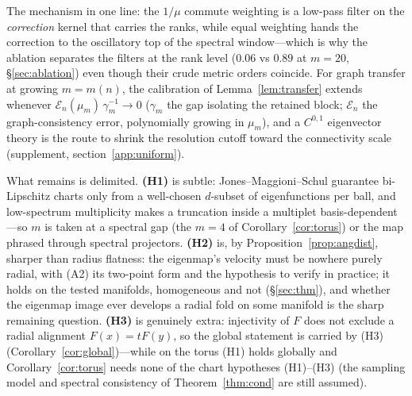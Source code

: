 \documentclass[review]{siamart220329}
\begin{document}
The mechanism in one line: the $1/\mu$ commute weighting is a low-pass filter
on the \emph{correction} kernel that carries the ranks, while equal weighting
hands the correction to the oscillatory top of the spectral window---which is
why the ablation separates the filters at the rank level ($0.06$ vs $0.89$ at
$m{=}20$, \S\ref{sec:ablation}) even though their crude metric orders coincide.
For graph transfer at growing $m=m(n)$, the calibration of
Lemma~\ref{lem:transfer} extends whenever
$\mathcal E_n(\mu_m)\,\gamma_m^{-1}\to0$ ($\gamma_m$ the gap isolating the
retained block; $\mathcal E_n$ the graph-consistency error, polynomially growing
in $\mu_m$), and a $C^{0,1}$ eigenvector theory \cite{calderlewicka2022} is the
route to shrink the resolution cutoff toward the connectivity scale (supplement,
section~\ref{app:uniform}).

What remains is delimited. \textbf{(H1)} is subtle: Jones--Maggioni--Schul
\cite{jones2010} guarantee bi-Lipschitz charts only from a well-chosen
$d$-subset of eigenfunctions per ball, and low-spectrum multiplicity makes a
truncation inside a multiplet basis-dependent---so $m$ is taken at a spectral
gap (the $m{=}4$ of Corollary~\ref{cor:torus}) or the map phrased through
spectral projectors. \textbf{(H2)} is, by Proposition~\ref{prop:angdist},
sharper than radius flatness: the eigenmap's velocity must be nowhere purely
radial, with (A2) its two-point form and the hypothesis to verify in
practice; it holds on the tested manifolds, homogeneous and not (\S\ref{sec:thm}),
and whether the eigenmap image ever develops a radial fold on some manifold is the
sharp remaining question. \textbf{(H3)} is genuinely extra:
injectivity of $F$ \cite{portegies2016} does not exclude a radial alignment
$F(x)=tF(y)$, so the global statement is carried by (H3)
(Corollary~\ref{cor:global})---while on the torus (H1) holds globally and
Corollary~\ref{cor:torus} needs none of the chart hypotheses (H1)--(H3) (the
sampling model and spectral consistency of Theorem~\ref{thm:cond} are still assumed).
\end{document}
